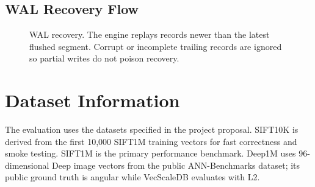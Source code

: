 \documentclass[11pt,a4paper]{article}
\begin{document}
\subsection{WAL Recovery Flow}

\begin{figure}[H]
\centering
{}
\caption{WAL recovery. The engine replays records newer than the latest flushed
segment. Corrupt or incomplete trailing records are ignored so partial writes do
not poison recovery.}
\end{figure}

\section{Dataset Information}

The evaluation uses the datasets specified in the project proposal. SIFT10K is
derived from the first 10,000 SIFT1M training vectors for fast correctness and
smoke testing. SIFT1M is the primary performance benchmark. Deep1M uses
96-dimensional Deep image vectors from the public ANN-Benchmarks dataset; its
public ground truth is angular while VecScaleDB evaluates with L2.
\end{document}
